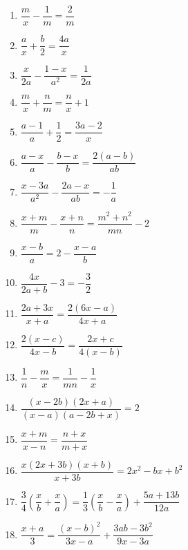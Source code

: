\documentclass{article}
\begin{document}
\begin{enumerate}[label=\bfseries\small 144.\arabic*, itemsep=3cm]
\large

\item $\dfrac{m}{x} - \dfrac{1}{m} = \dfrac{2}{m}$

\item $\dfrac{a}{x} + \dfrac{b}{2} = \dfrac{4a}{x}$

\item $\dfrac{x}{2a} - \dfrac{1-x}{a^2} = \dfrac{1}{2a}$

\item $\dfrac{m}{x} + \dfrac{n}{m} = \dfrac{n}{x} + 1$

\item $\dfrac{a-1}{a} + \dfrac{1}{2} = \dfrac{3a-2}{x}$

\item $\dfrac{a-x}{a} - \dfrac{b-x}{b} = \dfrac{2(a-b)}{ab}$

\item $\dfrac{x - 3a}{a^2} - \dfrac{2a - x}{ab} = -\dfrac{1}{a}$

\item $\dfrac{x + m}{m} - \dfrac{x + n}{n} = \dfrac{m^2 + n^2}{mn} - 2$

\item $\dfrac{x - b}{a} = 2 - \dfrac{x - a}{b}$

\item $\dfrac{4x}{2a + b} - 3 = -\dfrac{3}{2}$

\item $\dfrac{2a + 3x}{x + a} = \dfrac{2(6x - a)}{4x + a}$

\item $\dfrac{2(x - c)}{4x - b} = \dfrac{2x + c}{4(x - b)}$

\item $\dfrac{1}{n} - \dfrac{m}{x} = \dfrac{1}{mn} - \dfrac{1}{x}$

\item $\dfrac{(x-2b)(2x+a)}{(x-a)(a-2b+x)} = 2$

\item $\dfrac{x+m}{x-n} = \dfrac{n+x}{m+x}$

\item $\dfrac{x(2x+3b)(x+b)}{x+3b} = 2x^2 - bx + b^2$

\item $\dfrac{3}{4}\left(\dfrac{x}{b} + \dfrac{x}{a}\right) = \dfrac{1}{3}\left(\dfrac{x}{b} - \dfrac{x}{a}\right) + \dfrac{5a + 13b}{12a}$

\item $\dfrac{x+a}{3} = \dfrac{(x-b)^2}{3x-a} + \dfrac{3ab-3b^2}{9x-3a}$


\end{enumerate}
\end{document}
